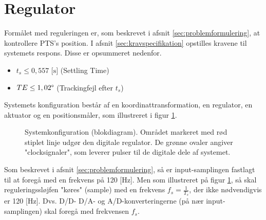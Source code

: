 \section{Regulator}
\label{sec:kontrollerdeign}
% 

Formålet med reguleringen er, som beskrevet i afsnit \ref{sec:problemformulering},
at kontrollere PTS's position.
I afsnit \ref{sec:kravspecifikation} opstilles kravene til systemets respons.
Disse er opsummeret nedenfor.
\begin{itemize}
\itemsep1pt
\item \(t_{s} \leq 0,557 \text{ [s]}\) (Settling Time)
\item \(TE \leq 1,02\degree\) (Trackingfejl efter \(t_s\))
\end{itemize}

Systemets konfiguration består af en koordinattransformation,
en regulator, en aktuator og en positionsmåler, som illustreret
i figur \ref{fig:digitalkontroller1}.
\begin{figure}[!th]
\centering
\begin{tikzpicture}[scale=0.8, every node/.style={scale=0.8}, node distance=2.6cm, =>latex']

\end{tikzpicture}
\caption[Systemkonfiguration]{Systemkonfiguration (blokdiagram).
	Området markeret med rød stiplet linje udgør den digitale regulator.
	De grønne ovaler angiver "clocksignaler", som leverer pulser til de digitale dele af systemet.}
\label{fig:digitalkontroller1}
\end{figure}

Som beskrevet i afsnit \ref{sec:problemformulering},
så er input-samplingen fastlagt til at foregå med en frekvens på 120 [Hz].
Men som illustreret på figur \ref{fig:digitalkontroller1}, så skal reguleringssløjfen
"køres" (sample) med en frekvens \(f_s=\frac{1}{T_s}\), der ikke nødvendigvis er 120 [Hz].
Dvs. D/D- D/A- og A/D-konverteringerne (på nær input-samplingen) skal foregå med frekvensen \(f_s\).


